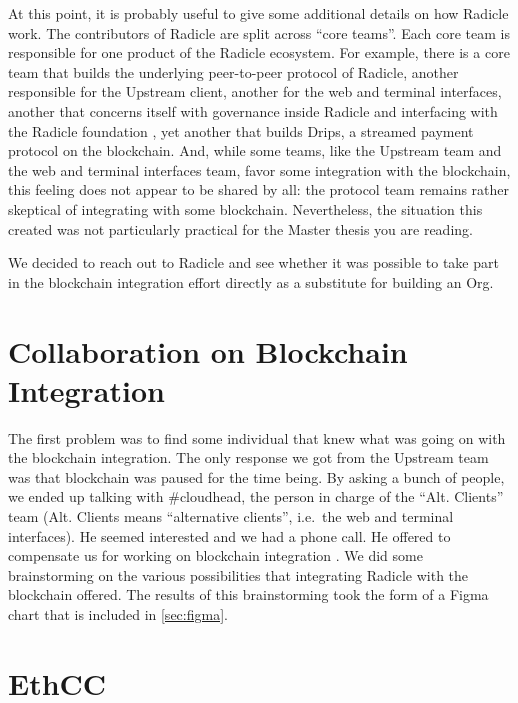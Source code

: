 At this point, it is probably useful to give some additional details on how Radicle work.
The contributors of Radicle are split across \enquote{core teams}.
Each core team is responsible for one product of the Radicle ecosystem.
For example, there is a core team that builds the underlying peer-to-peer protocol of Radicle, another responsible for the Upstream client, another for the web and terminal interfaces, another that concerns itself with governance inside Radicle and interfacing with the Radicle foundation%
, yet another that builds Drips, a streamed payment protocol on the blockchain.
And, while some teams, like the Upstream team and the web and terminal interfaces team, favor some integration with the blockchain, this feeling does not appear to be shared by all: the protocol team remains rather skeptical of integrating with some blockchain.
Nevertheless, the situation this created was not particularly practical for the Master thesis you are reading.

We decided to reach out to Radicle and see whether it was possible to take part in the blockchain integration effort directly as a substitute for building an Org.

\section{Collaboration on Blockchain Integration}

The first problem was to find some individual that knew what was going on with the blockchain integration.
The only response we got from the Upstream team was that blockchain was paused for the time being.
By asking a bunch of people, we ended up talking with \#cloudhead, the person in charge of the \enquote{Alt. Clients} team (Alt. Clients means \enquote{alternative clients}, i.e.\ the web and terminal interfaces).
He seemed interested and we had a phone call.
He offered to compensate us for working on blockchain integration%
.
We did some brainstorming on the various possibilities that integrating Radicle with the blockchain offered.
The results of this brainstorming took the form of a Figma chart that is included in \cref{sec:figma}.

\section{EthCC}

